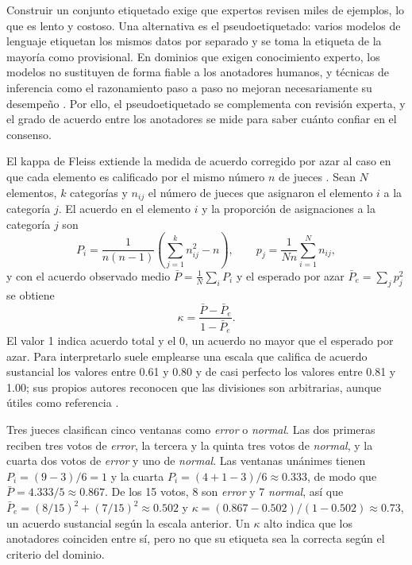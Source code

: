 Construir un conjunto etiquetado exige que expertos revisen miles de ejemplos, lo que es lento y costoso. Una alternativa es el pseudoetiquetado: varios modelos de lenguaje etiquetan los mismos datos por separado y se toma la etiqueta de la mayoría como provisional. En dominios que exigen conocimiento experto, los modelos no sustituyen de forma fiable a los anotadores humanos, y técnicas de inferencia como el razonamiento paso a paso no mejoran necesariamente su desempeño \cite{tseng2025_expert_annotators}. Por ello, el pseudoetiquetado se complementa con revisión experta, y el grado de acuerdo entre los anotadores se mide para saber cuánto confiar en el consenso.

El kappa de Fleiss extiende la medida de acuerdo corregido por azar al caso en que cada elemento es calificado por el mismo número $n$ de jueces \cite{fleiss1971_kappa}. Sean $N$ elementos, $k$ categorías y $n_{ij}$ el número de jueces que asignaron el elemento $i$ a la categoría $j$. El acuerdo en el elemento $i$ y la proporción de asignaciones a la categoría $j$ son
\begin{equation}
P_i = \frac{1}{n(n-1)} \left( \sum_{j=1}^{k} n_{ij}^2 - n \right), \qquad p_j = \frac{1}{N n} \sum_{i=1}^{N} n_{ij},
\end{equation}
y con el acuerdo observado medio $\bar{P} = \frac{1}{N}\sum_i P_i$ y el esperado por azar $\bar{P}_e = \sum_j p_j^2$ se obtiene
\begin{equation}
\kappa = \frac{\bar{P} - \bar{P}_e}{1 - \bar{P}_e}.
\end{equation}
El valor 1 indica acuerdo total y el 0, un acuerdo no mayor que el esperado por azar. Para interpretarlo suele emplearse una escala que califica de acuerdo sustancial los valores entre 0.61 y 0.80 y de casi perfecto los valores entre 0.81 y 1.00; sus propios autores reconocen que las divisiones son arbitrarias, aunque útiles como referencia \cite{landis1977_kappa}.

Tres jueces clasifican cinco ventanas como \emph{error} o \emph{normal}. Las dos primeras reciben tres votos de \emph{error}, la tercera y la quinta tres votos de \emph{normal}, y la cuarta dos votos de \emph{error} y uno de \emph{normal}. Las ventanas unánimes tienen $P_i = (9 - 3)/6 = 1$ y la cuarta $P_i = (4 + 1 - 3)/6 \approx 0.333$, de modo que $\bar{P} = 4.333/5 \approx 0.867$. De los 15 votos, 8 son \emph{error} y 7 \emph{normal}, así que $\bar{P}_e = (8/15)^2 + (7/15)^2 \approx 0.502$ y $\kappa = (0.867 - 0.502)/(1 - 0.502) \approx 0.73$, un acuerdo sustancial según la escala anterior. Un $\kappa$ alto indica que los anotadores coinciden entre sí, pero no que su etiqueta sea la correcta según el criterio del dominio.

